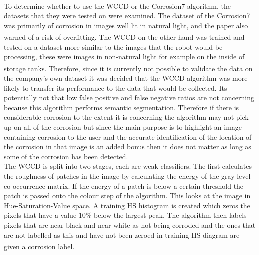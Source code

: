 \documentclass[11pt]{article}		%
\newcommand{\supercite}[1]{\textsuperscript{\cite{#1}}}		%
\begin{document}
	        \\
	        To determine whether to use the WCCD or the Corrosion7 algorithm, the datasets that they were tested on were examined. 
	        The dataset of the Corrosion7 was primarily of corrosion in images well lit in natural light, and the paper also warned of a risk of overfitting. \supercite{Corrosion7} 
	        The WCCD on the other hand was trained and tested on a dataset more similar to the images that the robot would be processing, these were images in non-natural light for example on the inside of storage tanks.\supercite{WCCD} 
	        Therefore, since it is currently not possible to validate the data on the company's own dataset it was decided that the WCCD algorithm was more likely to transfer its performance to the data that would be collected. 
	        Its potentially not that low false positive and false negative ratios are not concerning because this algorithm performs semantic segmentation. 
	        Therefore if there is considerable corrosion to the extent it is concerning the algorithm may not pick up on all of the corrosion but since the main purpose is to highlight an image containing corrosion to the user and the accurate identification of the location of the corrosion in that image is an added bonus then it does not matter as long as some of the corrosion has been detected.
	        \\
		    The WCCD is split into two stages, each are weak classifiers. The first calculates the roughness of patches in the image by calculating the energy of the gray-level co-occurrence-matrix. If the energy of a patch is below a certain threshold the patch is passed onto the colour step of the algorithm. This looks at the image in Hue-Saturation-Value space. A training HS histogram is created which zeros the pixels that have a value 10\% below the largest peak. The algorithm then labels pixels that are near black and near white as not being corroded and the ones that are not labelled as this and have not been zeroed in training HS diagram are given a corrosion label.\supercite{WCCD}  
		    \\
\end{document}
